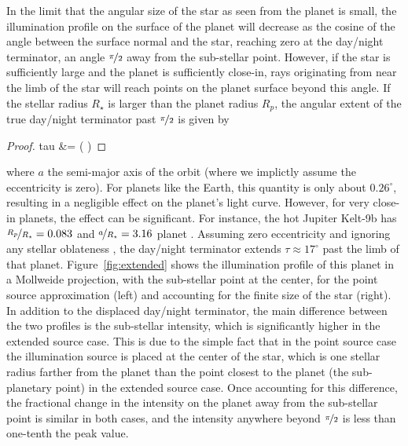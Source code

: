 \documentclass[modern]{aastex62}
\begin{document}
In the limit that the angular size of the star as seen from the planet is
small, the illumination profile on the surface of the planet will
decrease as the cosine of the angle between the surface normal and the star,
reaching zero at the day/night terminator, an angle $\nicefrac{\pi}{2}$
away from the sub-stellar point. However, if the star is sufficiently large
and the planet is sufficiently close-in, rays originating from near the limb
of the star will reach points on the planet surface beyond this angle.
If the stellar radius $R_\star$
is larger than the planet radius $R_p$, the angular extent of the true
day/night terminator past $\nicefrac{\pi}{2}$ is given by
%
\begin{proof}{tau}
    \label{eq:tau}
    \tau &= \arcsin\left(  \right)
\end{proof}
%
where $a$ the semi-major axis of the orbit (where we implictly assume
the eccentricity is zero).
For planets like the Earth, this quantity is only about $0.26^\circ$,
resulting in a negligible effect on the planet's light curve. However,
for very close-in planets, the effect can be significant. For instance,
the hot Jupiter Kelt-9b has $\nicefrac{R_p}{R_\star} = 0.083$ and
$\nicefrac{a}{R_\star} = 3.16$
planet \citep{Wong2019}. Assuming zero eccentricity and ignoring any
stellar oblateness
\citep[see][]{Ahlers2020},
the day/night terminator extends $\tau \approx 17^\circ$ past the limb
of that planet. Figure~\ref{fig:extended} shows the illumination profile
of this planet in a Mollweide projection, with the sub-stellar point at
the center, for the point source approximation (left) and accounting for
the finite size of the star (right). In addition to the
displaced day/night terminator, the main difference between
the two profiles is the sub-stellar intensity, which is significantly higher
in the extended source case. This is due to the simple fact that in the point
source case the illumination source is placed at the center of the star,
which is one stellar radius farther from the planet than the point closest
to the planet (the sub-planetary point) in the extended source case.
Once accounting for this difference, the fractional change in the intensity
on the planet away from the sub-stellar point is similar in both cases,
and the intensity anywhere beyond $\nicefrac{\pi}{2}$ is less than one-tenth
the peak value.
\end{document}

